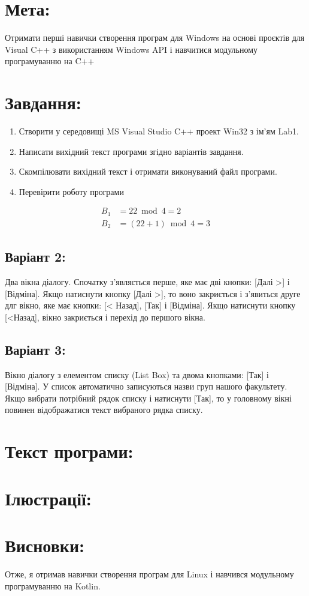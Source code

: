 \documentclass[14pt]{article}
\begin{document}


\tableofcontents
\newpage

\section{Мета:}
Отримати перші навички створення програм для Windows на
основі проєктів для Visual C++ з використанням Windows API і навчитися
модульному програмуванню на C++
\section{Завдання:}
\begin{enumerate}
    \item Створити у середовищі MS Visual Studio C++ проект Win32 з ім’ям Lab1.
    \item Написати вихідний текст програми згідно варіантів завдання.
    \item Скомпілювати вихідний текст і отримати виконуваний файл програми.
    \item Перевірити роботу програми
\end{enumerate}

\begin{align}
    B_1 &= 22 \bmod 4 = 2 \\
    B_2 &= (22+1) \bmod 4 = 3    
\end{align}

\subsection{Варіант 2:}
Два вікна діалогу. Спочатку
з’являється перше, яке має дві
кнопки: [Далі >] і [Відміна].
Якщо натиснути кнопку [Далі
>], то воно закриється і
з’явиться друге длг вікно, яке
має кнопки: [< Назад], [Так] і
[Відміна]. Якщо натиснути
кнопку [<Назад], вікно
закриється і перехід до
першого вікна.
\subsection{Варіант 3:}
Вікно діалогу з елементом
списку (List Box) та двома
кнопками: [Так] і [Відміна]. У
список автоматично
записуються назви груп
нашого факультету. Якщо
вибрати потрібний рядок
списку і натиснути [Так], то у
головному вікні повинен
відображатися текст
вибраного рядка списку.

\section{Текст програми:}


\section{Ілюстрації:}


\section{Висновки:}
Отже, я отримав навички створення програм для Linux і навчився модульному програмуванню на Kotlin.
\end{document}
